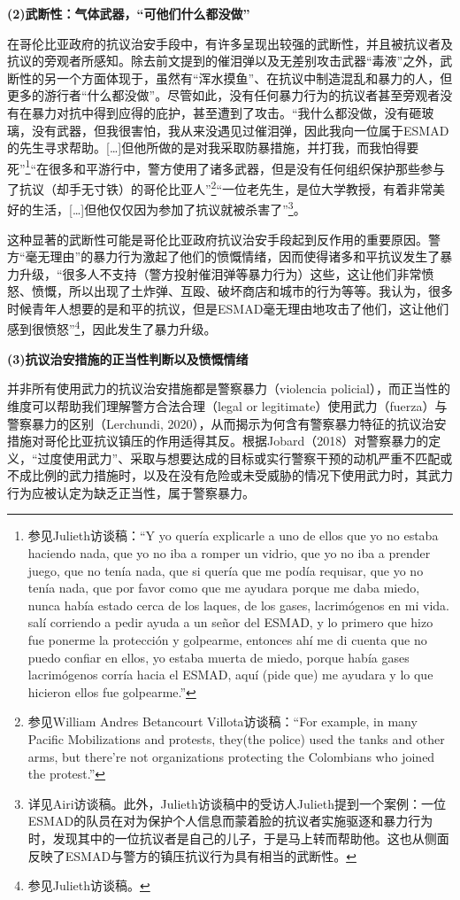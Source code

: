 \documentclass{phyasgn}\usepackage{nag}
\begin{document}
\par \textbf{(2)武断性：气体武器，“可他们什么都没做”}
\par 在哥伦比亚政府的抗议治安手段中，有许多呈现出较强的武断性，并且被抗议者及抗议的旁观者所感知。除去前文提到的催泪弹以及无差别攻击武器“毒液”之外，武断性的另一个方面体现于，虽然有“浑水摸鱼”、在抗议中制造混乱和暴力的人，但更多的游行者“什么都没做”。尽管如此，没有任何暴力行为的抗议者甚至旁观者没有在暴力对抗中得到应得的庇护，甚至遭到了攻击。“我什么都没做，没有砸玻璃，没有武器，但我很害怕，我从来没遇见过催泪弹，因此我向一位属于ESMAD的先生寻求帮助。[…]但他所做的是对我采取防暴措施，并打我，而我怕得要死”\footnote[71]{参见Julieth访谈稿：“Y yo quería explicarle a uno de ellos que yo no estaba haciendo nada, que yo no iba a romper un vidrio, que yo no iba a prender juego, que no tenía nada, que si quería que me podía requisar, que yo no tenía nada, que por favor como que me ayudara porque me daba miedo, nunca había estado cerca de los laques, de los gases, lacrimógenos en mi vida. salí corriendo a pedir ayuda a un señor del ESMAD, y lo primero que hizo fue ponerme la protección y golpearme, entonces ahí me di cuenta que no puedo confiar en ellos, yo estaba muerta de miedo, porque había gases lacrimógenos corría hacia el ESMAD, aquí (pide que) me ayudara y lo que hicieron ellos fue golpearme.”}“在很多和平游行中，警方使用了诸多武器，但是没有任何组织保护那些参与了抗议（却手无寸铁）的哥伦比亚人”\footnote[72]{参见William Andres Betancourt Villota访谈稿：“For example, in many Pacific Mobilizations and protests, they(the police) used the tanks and other arms, but there’re not organizations protecting the Colombians who joined the protest.”}“一位老先生，是位大学教授，有着非常美好的生活，[…]但他仅仅因为参加了抗议就被杀害了”\footnote[73]{详见Airi访谈稿。此外，Julieth访谈稿中的受访人Julieth提到一个案例：一位ESMAD的队员在对为保护个人信息而蒙着脸的抗议者实施驱逐和暴力行为时，发现其中的一位抗议者是自己的儿子，于是马上转而帮助他。这也从侧面反映了ESMAD与警方的镇压抗议行为具有相当的武断性。}。
\par 这种显著的武断性可能是哥伦比亚政府抗议治安手段起到反作用的重要原因。警方“毫无理由”的暴力行为激起了他们的愤慨情绪，因而使得诸多和平抗议发生了暴力升级，“很多人不支持（警方投射催泪弹等暴力行为）这些，这让他们非常愤怒、愤慨，所以出现了土炸弹、互殴、破坏商店和城市的行为等等。我认为，很多时候青年人想要的是和平的抗议，但是ESMAD毫无理由地攻击了他们，这让他们感到很愤怒”\footnote[74]{参见Julieth访谈稿。}，因此发生了暴力升级。
\par \textbf{(3)抗议治安措施的正当性判断以及愤慨情绪}
\par 并非所有使用武力的抗议治安措施都是警察暴力（violencia policial），而正当性的维度可以帮助我们理解警方合法合理（legal or legitimate）使用武力（fuerza）与警察暴力的区别（Lerchundi, 2020），从而揭示为何含有警察暴力特征的抗议治安措施对哥伦比亚抗议镇压的作用适得其反。根据Jobard（2018）对警察暴力的定义，“过度使用武力”、采取与想要达成的目标或实行警察干预的动机严重不匹配或不成比例的武力措施时，以及在没有危险或未受威胁的情况下使用武力时，其武力行为应被认定为缺乏正当性，属于警察暴力。
\end{document}
